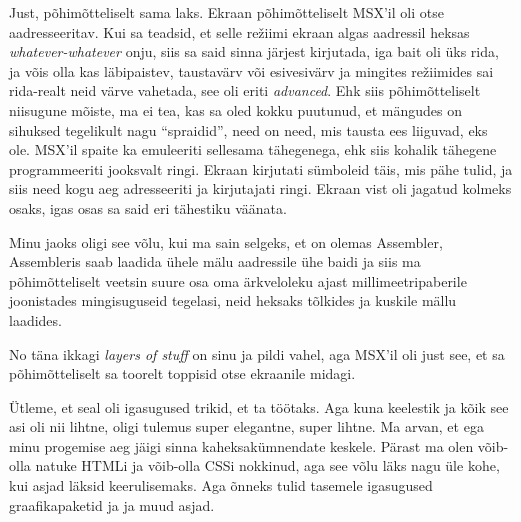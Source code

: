 
Just, põhimõtteliselt sama laks. Ekraan põhimõtteliselt MSX'il oli otse aadresseeritav. Kui sa teadsid, et selle režiimi ekraan algas aadressil heksas \emph{whatever-whatever} onju, siis sa said sinna järjest kirjutada, iga bait oli üks rida, ja võis olla kas  läbipaistev, taustavärv või esivesivärv ja mingites režiimides sai rida-realt neid värve vahetada, see oli eriti \emph{advanced}. Ehk siis põhimõtteliselt niisugune mõiste, ma ei tea, kas sa oled kokku puutunud, et mängudes on sihuksed tegelikult nagu \enquote{spraidid}, need on need, mis tausta ees liiguvad, eks ole. MSX'il spaite ka emuleeriti sellesama tähegenega, ehk siis kohalik tähegene programmeeriti jooksvalt ringi. Ekraan kirjutati sümboleid täis, mis  pähe tulid, ja siis need kogu aeg adresseeriti ja kirjutajati ringi. Ekraan vist oli jagatud kolmeks osaks, igas osas sa said eri tähestiku väänata.

Minu jaoks oligi see võlu, kui ma sain selgeks, et on olemas Assembler, Assembleris saab laadida ühele mälu aadressile ühe baidi ja siis ma põhimõtteliselt veetsin suure osa oma ärkveloleku ajast millimeetripaberile joonistades mingisuguseid tegelasi, neid heksaks tõlkides ja kuskile mällu laadides. 


No täna ikkagi \emph{layers of stuff} on sinu ja pildi vahel, aga MSX'il oli just see, et sa põhimõtteliselt sa toorelt toppisid otse ekraanile midagi. 


Ütleme, et seal oli igasugused trikid, et ta töötaks. Aga kuna keelestik ja kõik see asi oli nii lihtne, oligi tulemus super elegantne, super  lihtne.  Ma arvan, et ega minu progemise aeg jäigi sinna kaheksakümnendate keskele. Pärast ma olen võib-olla natuke HTMLi ja võib-olla CSSi nokkinud, aga see võlu läks nagu üle kohe, kui asjad läksid keerulisemaks. Aga õnneks tulid tasemele igasugused graafikapaketid ja ja muud asjad. 


